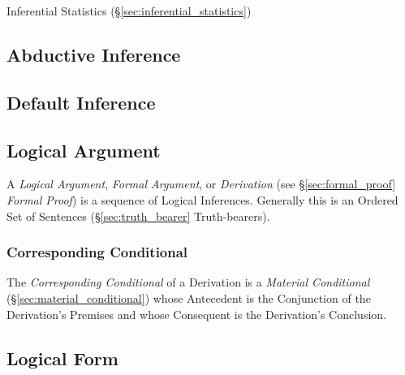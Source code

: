 Inferential Statistics (\S\ref{sec:inferential_statistics})



\subsection{Abductive Inference}\label{sec:abductive_inference}



\subsection{Default Inference}\label{sec:default_inference}

\subsection{Logical Argument}\label{sec:logical_argument}

A \emph{Logical Argument}, \emph{Formal Argument}, or
\emph{Derivation} (see \S\ref{sec:formal_proof} \emph{Formal Proof})
is a sequence of Logical Inferences. Generally this is an Ordered Set
of Sentences (\S\ref{sec:truth_bearer} Truth-bearers).



\subsubsection{Corresponding Conditional}\label{sec:corresponding_conditional}

The \emph{Corresponding Conditional} of a Derivation is a
\emph{Material Conditional} (\S\ref{sec:material_conditional}) whose
Antecedent is the Conjunction of the Derivation's Premises and whose
Consequent is the Derivation's Conclusion.



\subsection{Logical Form}\label{sec:logical_form}

